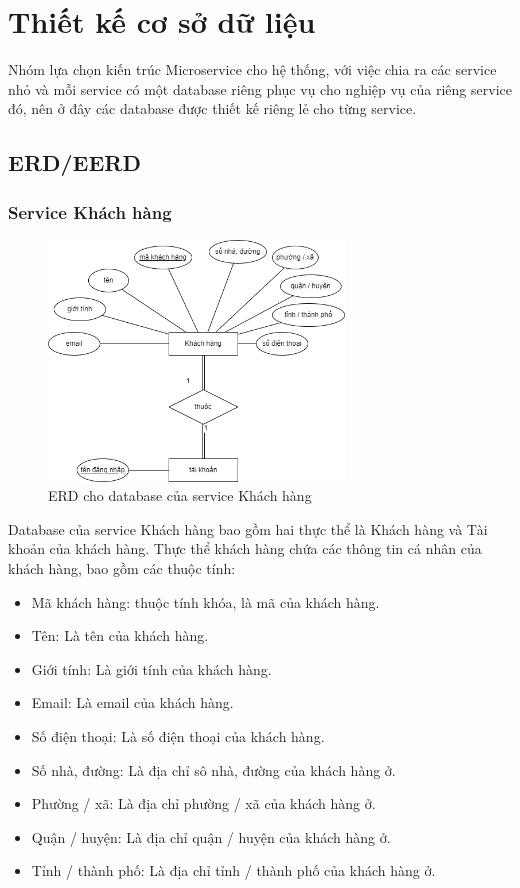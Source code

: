 \section{Thiết kế cơ sở dữ liệu}
\par Nhóm lựa chọn kiến trúc Microservice cho hệ thống, với việc chia ra các service nhỏ và mỗi service có một database riêng phục vụ cho nghiệp vụ của riêng service đó, nên ở đây các database được thiết kế riêng lẻ cho từng service.

\subsection{ERD/EERD}
\subsubsection{Service Khách hàng}
\begin{figure}[!htp]
    \begin{center}
        \includegraphics[width=0.7\textwidth]{img/database/erd/eerd-customer.png}
        \newline
        \caption{ERD cho database của service Khách hàng}
    \end{center}
\end{figure}

\par Database của service Khách hàng bao gồm hai thực thể là Khách hàng và Tài khoản của khách hàng. Thực thể khách hàng chứa các thông tin cá nhân của khách hàng, bao gồm các thuộc tính:
\begin{itemize}
    \item Mã khách hàng: thuộc tính khóa, là mã của khách hàng.
    \item Tên: Là tên của khách hàng.
    \item Giới tính: Là giới tính của khách hàng.
    \item Email: Là email của khách hàng.
    \item Số điện thoại: Là số điện thoại của khách hàng.
    \item Số nhà, đường: Là địa chỉ sô nhà, đường của khách hàng ở.
    \item Phường / xã: Là địa chỉ phường / xã của khách hàng ở.
    \item Quận / huyện: Là địa chỉ quận / huyện của khách hàng ở.
    \item Tỉnh / thành phố: Là địa chỉ tỉnh / thành phố của khách hàng ở.
\end{itemize}

